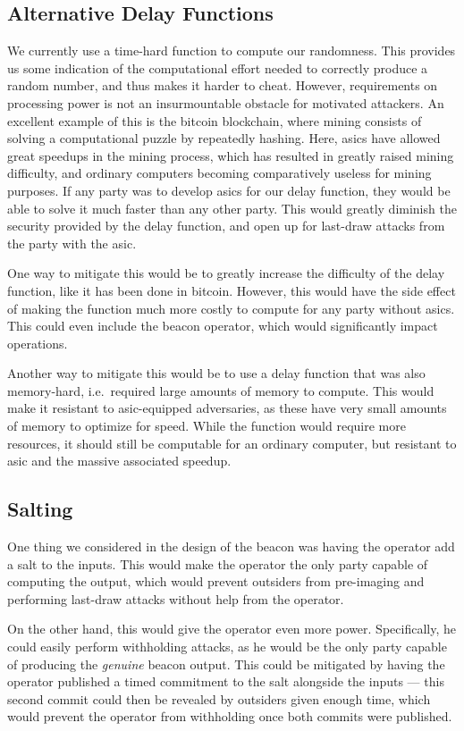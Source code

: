 \subsection{Alternative Delay Functions}
We currently use a time-hard function to compute our randomness.
This provides us some indication of the computational effort needed to correctly produce a random number, and thus makes it harder to cheat.
However, requirements on processing power is not an insurmountable obstacle for motivated attackers.
An excellent example of this is the bitcoin blockchain, where mining consists of solving a computational puzzle by repeatedly hashing.
Here, \glspl{asic} have allowed great speedups in the mining process, which has resulted in greatly raised mining difficulty, and ordinary computers becoming comparatively useless for mining purposes.
If any party was to develop \glspl{asic} for our delay function, they would be able to solve it much faster than any other party.
This would greatly diminish the security provided by the delay function, and open up for last-draw attacks from the party with the \gls{asic}.

One way to mitigate this would be to greatly increase the difficulty of the delay function, like it has been done in bitcoin.
However, this would have the side effect of making the function much more costly to compute for any party without \glspl{asic}.
This could even include the beacon operator, which would significantly impact operations.

Another way to mitigate this would be to use a delay function that was also memory-hard, i.e.\ required large amounts of memory to compute.
This would make it resistant to \gls{asic}-equipped adversaries, as these have very small amounts of memory to optimize for speed.
While the function would require more resources, it should still be computable for an ordinary computer, but resistant to \gls{asic} and the massive associated speedup.

\subsection{Salting}

One thing we considered in the design of the beacon was having the operator add a salt to the inputs.
This would make the operator the only party capable of computing the output, which would prevent outsiders from pre-imaging and performing last-draw attacks without help from the operator.

On the other hand, this would give the operator even more power.
Specifically, he could easily perform withholding attacks, as he would be the only party capable of producing the \textit{genuine} beacon output.
This could be mitigated by having the operator published a timed commitment to the salt alongside the inputs --- this second commit could then be revealed by outsiders given enough time, which would prevent the operator from withholding once both commits were published.

